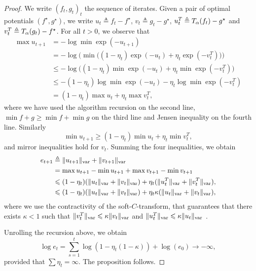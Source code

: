 \begin{proof}
    We write ${(f_t, g_t)}_t$ the sequence of iterates. Given a pair of optimal potentials 
    $(f^\star, g^\star)$, we write $u_t \triangleq f_t - f^\star$, $v_t \triangleq g_t - g^\star$,
    $u_t^T \triangleq T_{\alpha}(f_t) - g^\star$ and $v_t^T \triangleq T_{\alpha}(g_t) - f^\star$.
    For all $t > 0$, we observe that 
    \begin{align}
        \max u_{t+1} &= - \log \min \exp(-u_{t+1}) \\
        &= - \log \big( \min \big( (1 - \eta_t) \exp(-u_{t}) + \eta_t 
        \exp(-v_t^T) \big) \big)\\
        &\leq - \log \big( (1 - \eta_t) \min \exp(-u_{t}) + \eta_t 
        \min \exp(-v_t^T) \big)\\
        &\leq - (1 - \eta_t) \log \min \exp(-u_{t}) -  \eta_t \log \min
         \exp(-v_t^T) \\
         &= (1 - \eta_t) \max u_t  + \eta_t \max v_t^T,
    \end{align}
    where we have used the algorithm recursion on the second line, $\min f + g \geq \min f + \min g$
     on the third line and Jensen inequality on the fourth line. Similarly
    \begin{equation}
        \min u_{t+1} \geq (1 - \eta_t) \min u_t  + \eta_t \min v_t^T,
    \end{equation}
    and mirror inequalities hold for $v_t$. Summing the four inequalities, we obtain
    \begin{align}\label{eq:et}
        e_{t+1} &\triangleq \Vert u_{t+1} \Vert_{\text{\upshape var}} + \Vert v_{t+1} \Vert_{\text{\upshape var}} \\ 
        &= \max u_{t+1} - \min u_{t+1} + \max v_{t+1} - \min v_{t+1} \\
        &\leqslant
        (1 - \eta_t) ( \Vert u_t \Vert_{\text{\upshape var}} + \Vert v_t \Vert_{\text{\upshape var}})
        + \eta_t ( \Vert u_t^T \Vert_{\text{\upshape var}} + \Vert v_t^T \Vert_{\text{\upshape var}}), \\
        &\leqslant
        (1 - \eta_t) ( \Vert u_t \Vert_{\text{\upshape var}} + \Vert v_t \Vert_{\text{\upshape var}})
        + \eta_t \kappa ( \Vert u_t \Vert_{\text{\upshape var}} + \Vert v_t \Vert_{\text{\upshape var}}),
    \end{align}
    where we use the contractivity of the soft-$C$-transform, that guarantees that
    there exists $\kappa < 1$ such that $\Vert v_t^T\Vert_{\text{\upshape var}} \leqslant \kappa \Vert
    v_t\Vert_{\text{\upshape var}}$ and $\Vert u_t^T\Vert_{\text{\upshape var}} \leqslant \kappa \Vert
    u_t\Vert_{\text{\upshape var}}$ \citep{peyre2019computational}.

    Unrolling the recursion above, we obtain
    \begin{equation}
        \log e_t = \sum_{s=1}^t \log(1 - \eta_t (1 - \kappa)) + \log(e_0) \to - \infty,
    \end{equation}
    provided that $\sum \eta_t = \infty$. The proposition follows.
\end{proof}



